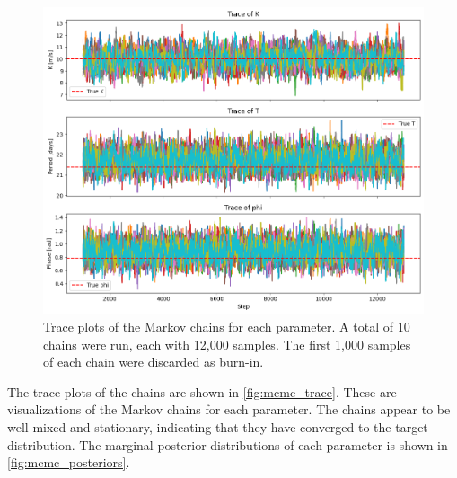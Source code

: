 \documentclass[preprint,longauthor]{aastex631}
\numberwithin{equation}{section}
\begin{document}
\begin{figure}[ht!]
\centering
\includegraphics[width=\textwidth]{../scripts/2.5/figures/traces.png}
\caption{Trace plots of the Markov chains for each parameter. A total of 10 chains were run, each with 12,000 samples. The first 1,000 samples of each chain were discarded as burn-in.}
\label{fig:mcmc_trace}
\end{figure}

The trace plots of the chains are shown in \autoref{fig:mcmc_trace}. These are visualizations of the Markov chains for each parameter. The chains appear to be well-mixed and stationary, indicating that they have converged to the target distribution. The marginal posterior distributions of each parameter is shown in \autoref{fig:mcmc_posteriors}.
\end{document}
